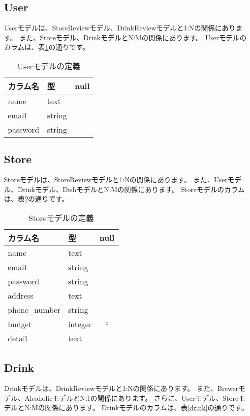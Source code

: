 \documentclass[a4j,titlepage]{jarticle}
\begin{document}
\subsection{User}
Userモデルは、StoreReviewモデル、DrinkReviewモデルと1:Nの関係にあります。
また、Storeモデル、DrinkモデルとN:Mの関係にあります。
Userモデルのカラムは、表\ref{user}の通りです。

\begin{table}[!htbp]
\caption{Userモデルの定義}
\label{user}
\small
\begin{center}
\begin{tabular}{|l|l|c|}\hline
カラム名 & 型 & null \\\hline\hline
name & text & \\\hline
email & string & \\\hline
password & string & \\\hline
\end{tabular}
\end{center}
\end{table}

\subsection{Store}
Storeモデルは、StoreReviewモデルと1:Nの関係にあります。
また、Userモデル、Drinkモデル、DishモデルとN:Mの関係にあります。
Storeモデルのカラムは、表\ref{store}の通りです。

\begin{table}[!htbp]
\caption{Storeモデルの定義}
\label{store}
\small
\begin{center}
\begin{tabular}{|l|l|c|}\hline
カラム名 & 型 & null \\\hline\hline
name & text & \\\hline
email & string & \\\hline
password & string & \\\hline
address & text & \\\hline
phone\_number & string & \\\hline
budget & integer & $\circ$ \\\hline
detail & text & \\\hline
\end{tabular}
\end{center}
\end{table}

\subsection{Drink}
Drinkモデルは、DrinkReviewモデルと1:Nの関係にあります。
また、Brewerモデル、AlcoholicモデルとN:1の関係にあります。
さらに、Userモデル、StoreモデルとN:Mの関係にあります。
Drinkモデルのカラムは、表\ref{drink}の通りです。
\end{document}
